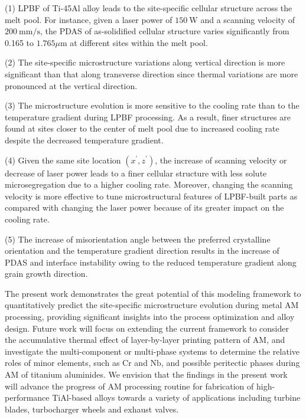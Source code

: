 \documentclass[10pt]{article}
\begin{document}
(1) LPBF of Ti-45Al alloy leads to the site-specific cellular structure across the melt pool. For instance, given a laser power of $150 \mathrm{~W}$ and a scanning velocity of $200 \mathrm{~mm} / \mathrm{s}$, the PDAS of as-solidified cellular structure varies significantly from 0.165 to $1.765 \mu \mathrm{m}$ at different sites within the melt pool.

(2) The site-specific microstructure variations along vertical direction is more significant than that along transverse direction since thermal variations are more pronounced at the vertical direction.

(3) The microstructure evolution is more sensitive to the cooling rate than to the temperature gradient during LPBF processing. As a result, finer structures are found at sites closer to the center of melt pool due to increased cooling rate despite the decreased temperature gradient.

(4) Given the same site location $\left(x^{\prime}, z^{\prime}\right)$, the increase of scanning velocity or decrease of laser power leads to a finer cellular structure with less solute microsegregation due to a higher cooling rate. Moreover, changing the scanning velocity is more effective to tune microstructural features of LPBF-built parts as compared with changing the laser power because of its greater impact on the cooling rate.

(5) The increase of misorientation angle between the preferred crystalline orientation and the temperature gradient direction results in the increase of PDAS and interface instability owing to the reduced temperature gradient along grain growth direction.

The present work demonstrates the great potential of this modeling framework to quantitatively predict the site-specific microstructure evolution during metal AM processing, providing significant insights into the process optimization and alloy design. Future work will focus on extending the current framework to consider the accumulative thermal effect of layer-by-layer printing pattern of AM, and investigate the multi-component or multi-phase systems to determine the relative roles of minor elements, such as $\mathrm{Cr}$ and $\mathrm{Nb}$, and possible peritectic phases during AM of titanium aluminides. We envision that the findings in the present work will advance the progress of AM processing routine for fabrication of high-performance TiAl-based alloys towards a variety of applications including turbine blades, turbocharger wheels and exhaust valves.
\end{document}
